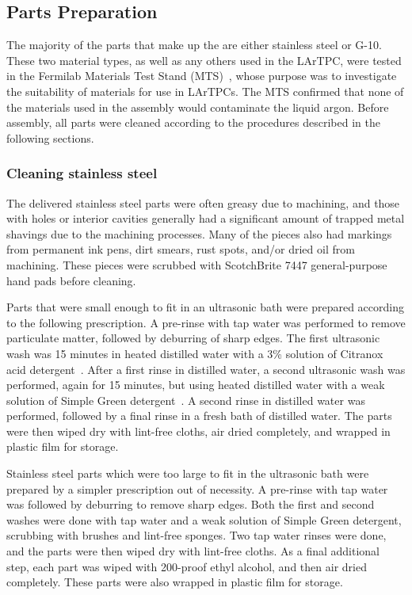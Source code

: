%
\subsection{Parts Preparation}

The majority of the parts that make up the \lartpc are either stainless steel or G-10. These two material types, as well as any others used in the LArTPC, were tested in the Fermilab Materials Test Stand (MTS)~\cite{Rebel:2011-MTS}, whose purpose was to investigate the suitability of materials for use in LArTPCs.  The MTS confirmed that none of the materials used in the \lartpc assembly would contaminate the liquid argon.  Before assembly, all \lartpc parts were cleaned according to the procedures described in the following sections.

\subsubsection{Cleaning stainless steel}

The delivered stainless steel parts were often greasy due to machining, and those with holes or interior cavities generally had a significant amount of trapped metal shavings due to the machining processes. Many of the pieces also had markings from permanent ink pens, dirt smears, rust spots, and/or dried oil from machining. These pieces were scrubbed with ScotchBrite 7447 general-purpose hand pads before cleaning.

Parts that were small enough to fit in an ultrasonic bath were prepared according to the following prescription. A pre-rinse with tap water was performed to remove particulate matter, followed by deburring of sharp edges. The first ultrasonic wash was 15 minutes in heated distilled water with a 3\% solution of Citranox acid detergent~\cite{citranox}. After a first rinse in distilled water, a second ultrasonic wash was performed, again for 15 minutes, but using heated distilled water with a weak solution of Simple Green detergent~\cite{simplegreen}. A second rinse in distilled water was performed, followed by a final rinse in a fresh bath of distilled water. The parts were then wiped dry with lint-free cloths, air dried completely, and wrapped in plastic film for storage.

Stainless steel parts which were too large to fit in the ultrasonic bath were prepared by a simpler prescription out of necessity. A pre-rinse with tap water was followed by deburring to remove sharp edges. Both the first and second washes were done with tap water and a weak solution of Simple Green detergent, scrubbing with brushes and lint-free sponges. Two tap water rinses were done, and the parts were then wiped dry with lint-free cloths. As a final additional step, each part was wiped with 200-proof ethyl alcohol, and then air dried completely. These parts were also wrapped in plastic film for storage.

